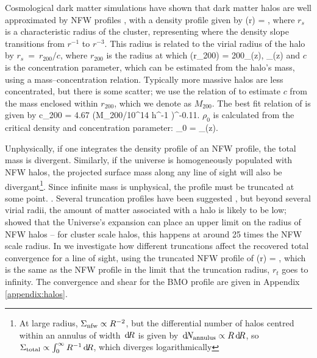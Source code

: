 \documentclass[useAMS,usenatbib]{mn2e}
\begin{document}
Cosmological dark matter simulations have shown that dark matter
halos are well approximated by NFW profiles \citep{NFW}, with a density
profile given by
\be\label{eq:rhonfw}
\rho(r) = 
,
\ee
where $r_{s}$ is a characteristic radius of the cluster, representing where
the density slope transitions from $r^{-1}$ to $r^{-3}$. This radius is related
to the virial radius of the halo by $r_{s}~=~r_{200}/c$, where $r_{200}$ is the radius at 
which 
\be
\rho(r_{200}) = 200\rho_{{}}(z),  \rho_{}(z) \equiv {}
\ee
and $c$ is the concentration parameter, which can be estimated from the halo's mass,
using a mass--concentration relation. Typically more massive halos are less concentrated,
but there is some scatter; we use the relation of \citet{Neto2007} to estimate $c$
from the mass enclosed within $r_{200}$, which we denote as $M_{200}$. The best fit relation of \citet{Neto2007} is given by
\be
c_{200} = 4.67 (M_{200}/10^{14} h^{-1} \Msun)^{-0.11}.
\ee
$\rho_0$ is calculated from the critical density and concentration parameter:
\be
\rho_0 = \rho_{}(z).
\ee

Unphysically, if one integrates the density profile of an NFW profile, the total mass is divergent.
Similarly, if the universe is homogeneously populated with NFW halos, the projected surface mass along any
line of sight will also be divergant\footnote{At large radius, $\Sigma_{\rm
nfw} \propto R^{-2}$, but the differential number of halos centred within an
annulus of width $\, \mathrm{d} \! R$ is given by $\, \mathrm{d} \! N_{\rm annulus} \propto R \, \mathrm{d} \! R$,
so  $\Sigma_{\rm total} \propto \int_{0}^{\infty} R^{-1} \, \mathrm{d} \! R$, which
diverges logarithmically}. Since infinite mass is unphysical, the profile must
be truncated at some point. . Several truncation profiles have been suggested \citep[e.g][]{BMO}, but beyond several virial radii, the amount of matter associated with a halo is likely to be low; \citet{NandraEtal2012} showed that the Universe's expansion can place an upper limit on the radius of NFW halos -- for cluster scale halos, this happens at around 25 times the NFW scale radius. In  we investigate how different truncations affect the recovered total convergence for a line of sight, using the truncated NFW profile of \citet{BMO}
\be\label{eq:bmoprofile}
\rho(r) = 
,
\ee
which is the same as the NFW profile in the limit that the truncation radius, $r_t$ goes to infinity. The convergence and shear for the BMO profile are given in Appendix \ref{appendix:halos}.
\end{document}
